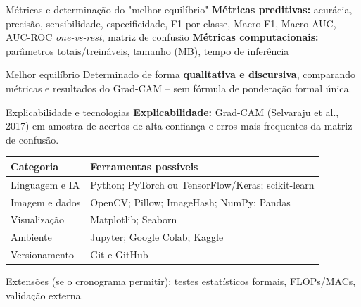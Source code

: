 \documentclass[aspectratio=169]{beamer}
\begin{document}
\begin{frame}{Métricas e determinação do "melhor equilíbrio"}
  \textbf{Métricas preditivas:} acurácia, precisão, sensibilidade, especificidade, F1 por classe, Macro F1, Macro AUC, AUC-ROC \textit{one-vs-rest}, matriz de confusão
  \vspace{4pt}
  \textbf{Métricas computacionais:} parâmetros totais/treináveis, tamanho (MB), tempo de inferência
  \vspace{10pt}
  \begin{alertblock}{Melhor equilíbrio}
    Determinado de forma \textbf{qualitativa e discursiva}, comparando métricas e resultados do Grad-CAM -- sem fórmula de ponderação formal única.
  \end{alertblock}
\end{frame}

\begin{frame}{Explicabilidade e tecnologias}
  \textbf{Explicabilidade:} Grad-CAM (Selvaraju et al., 2017) em amostra de acertos de alta confiança e erros mais frequentes da matriz de confusão.
  \vspace{10pt}
  \begin{table}
    \centering
    \small
    \begin{tabular}{@{}ll@{}}
      \toprule
      \textbf{Categoria} & \textbf{Ferramentas possíveis} \\
      \midrule
      Linguagem e IA & Python; PyTorch ou TensorFlow/Keras; scikit-learn \\
      Imagem e dados & OpenCV; Pillow; ImageHash; NumPy; Pandas \\
      Visualização & Matplotlib; Seaborn \\
      Ambiente & Jupyter; Google Colab; Kaggle \\
      Versionamento & Git e GitHub \\
      \bottomrule
    \end{tabular}
  \end{table}
  {\footnotesize Extensões (se o cronograma permitir): testes estatísticos formais, FLOPs/MACs, validação externa.}
\end{frame}

\end{document}
